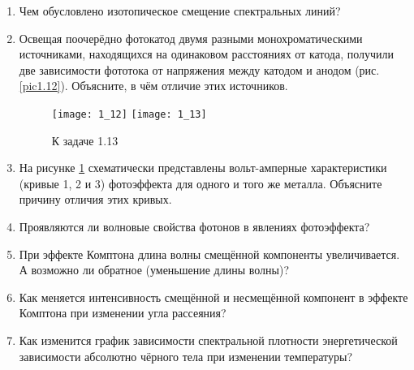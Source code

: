 \begin{enumerate}
\item Чем обусловлено изотопическое смещение спектральных линий?

\item Освещая поочерёдно фотокатод двумя разными монохроматическими
источниками, находящихся на одинаковом расстояниях от катода, получили две
зависимости фототока от напряжения между катодом и анодом (рис. \ref{pic1.12}).
Объясните, в чём отличие этих источников.

    \begin{figure}[h!]
        \center
        \texttt{[image: 1\_12]} \hspace*{2em}
        \texttt{[image: 1\_13]}
        \parbox{.37\textwidth}{\caption{К задаче 1.12} \label{pic1.12}} \hspace*{2em}
        \parbox{.37\textwidth}{\caption{К задаче 1.13} \label{pic1.13}}
    \end{figure}

\item На рисунке \ref{pic1.13} схематически представлены вольт-амперные характеристики
(кривые 1, 2 и 3) фотоэффекта для одного и того же металла. Объясните причину
отличия этих кривых.

\item Проявляются ли волновые свойства фотонов в явлениях фотоэффекта?

\item При эффекте Комптона длина волны смещённой компоненты увеличивается. А
возможно ли обратное (уменьшение длины волны)?

\item Как меняется интенсивность смещённой и несмещённой компонент в эффекте
Комптона при изменении угла рассеяния?

\item Как изменится график зависимости спектральной плотности энергетической
зависимости абсолютно чёрного тела при изменении температуры?

\end{enumerate}